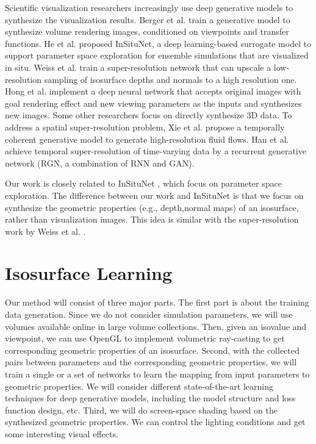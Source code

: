 \documentclass[journal]{vgtc}                %
\begin{document}
Scientific visualization researchers increasingly use deep generative models to synthesize the visualization results. Berger et al. \cite{berger2018generative} train a generative model to synthesize volume rendering images, conditioned on viewpoints and transfer functions. He et al. \cite{he2019insitunet} proposed InSituNet, a deep learning-based surrogate model to support parameter space exploration for ensemble simulations that are visualized in situ. Weiss et al. \cite{weiss2019volumetric} train a super-resolution network that can upscale a low-resolution sampling of isosurface depths and normals to a high resolution one. Hong et al. \cite{hong2019dnn} implement a deep neural network that accepts original images with goal rendering effect and new viewing parameters as the inputs and synthesizes new images. Some other researchers focus on directly synthesize 3D data. To address a spatial super-resolution problem, Xie et al. \cite{xie2018tempogan} propose a temporally coherent generative model to generate high-resolution fluid flows. Han et al. \cite{han2019tsr} achieve temporal super-resolution of time-varying data by a recurrent generative network (RGN, a combination of RNN and GAN).

Our work is closely related to InSituNet \cite{he2019insitunet}, which focus on parameter space exploration. The difference between our work and InSituNet is that we focus on synthesize the  geometric properties (e.g., depth,normal maps) of an isosurface, rather than visualization images. This idea is similar with the super-resolution work by Weiss et al. \cite{weiss2019volumetric}. 


\section{Isosurface Learning}

Our method will consist of three major parts. The first part is about the training data generation. Since we do not consider simulation parameters, we will use volumes available online in large volume collections. Then, given an isovalue and viewpoint, we can use OpenGL \cite{woo1999opengl} to implement volumetric ray-casting to get corresponding geometric properties of an isosurface. Second, with the collected pairs between parameters and the corresponding geometric properties, we will train a single or a set of networks to learn the mapping from input parameters to geometric properties. We will consider different state-of-the-art learning techniques for deep generative models, including the model structure and loss function design, etc. Third, we will do screen-space shading based on the synthesized geometric properties. We can control the lighting conditions and get some interesting visual effects. 
\end{document}
